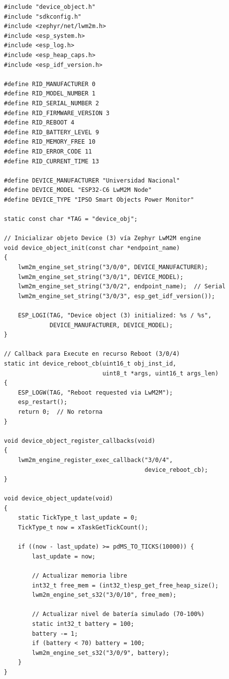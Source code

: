 \begin{verbatim}
#include "device_object.h"
#include "sdkconfig.h"
#include <zephyr/net/lwm2m.h>
#include <esp_system.h>
#include <esp_log.h>
#include <esp_heap_caps.h>
#include <esp_idf_version.h>

#define RID_MANUFACTURER 0
#define RID_MODEL_NUMBER 1
#define RID_SERIAL_NUMBER 2
#define RID_FIRMWARE_VERSION 3
#define RID_REBOOT 4
#define RID_BATTERY_LEVEL 9
#define RID_MEMORY_FREE 10
#define RID_ERROR_CODE 11
#define RID_CURRENT_TIME 13

#define DEVICE_MANUFACTURER "Universidad Nacional"
#define DEVICE_MODEL "ESP32-C6 LwM2M Node"
#define DEVICE_TYPE "IPSO Smart Objects Power Monitor"

static const char *TAG = "device_obj";

// Inicializar objeto Device (3) vía Zephyr LwM2M engine
void device_object_init(const char *endpoint_name)
{
    lwm2m_engine_set_string("3/0/0", DEVICE_MANUFACTURER);
    lwm2m_engine_set_string("3/0/1", DEVICE_MODEL);
    lwm2m_engine_set_string("3/0/2", endpoint_name);  // Serial
    lwm2m_engine_set_string("3/0/3", esp_get_idf_version());

    ESP_LOGI(TAG, "Device object (3) initialized: %s / %s",
             DEVICE_MANUFACTURER, DEVICE_MODEL);
}

// Callback para Execute en recurso Reboot (3/0/4)
static int device_reboot_cb(uint16_t obj_inst_id,
                            uint8_t *args, uint16_t args_len)
{
    ESP_LOGW(TAG, "Reboot requested via LwM2M");
    esp_restart();
    return 0;  // No retorna
}

void device_object_register_callbacks(void)
{
    lwm2m_engine_register_exec_callback("3/0/4",
                                        device_reboot_cb);
}

void device_object_update(void)
{
    static TickType_t last_update = 0;
    TickType_t now = xTaskGetTickCount();

    if ((now - last_update) >= pdMS_TO_TICKS(10000)) {
        last_update = now;

        // Actualizar memoria libre
        int32_t free_mem = (int32_t)esp_get_free_heap_size();
        lwm2m_engine_set_s32("3/0/10", free_mem);

        // Actualizar nivel de batería simulado (70-100%)
        static int32_t battery = 100;
        battery -= 1;
        if (battery < 70) battery = 100;
        lwm2m_engine_set_s32("3/0/9", battery);
    }
}
\end{verbatim}

